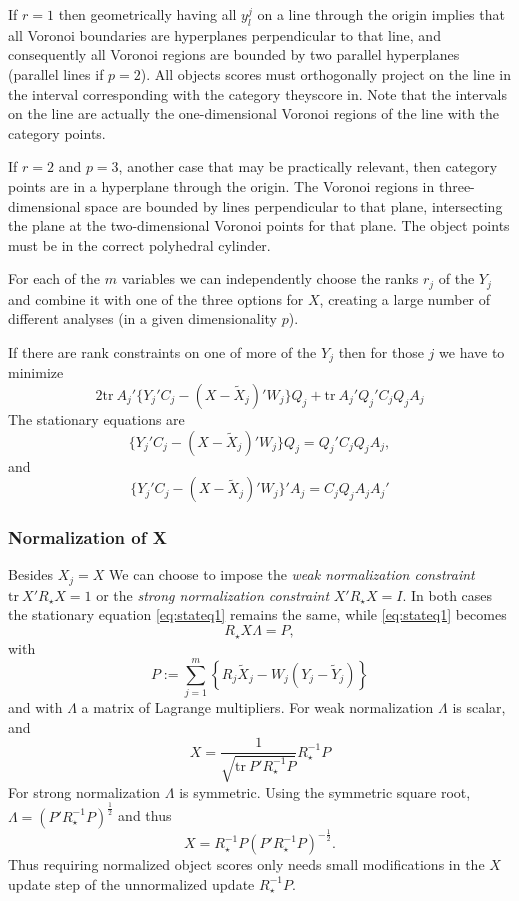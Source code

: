 \documentclass[
  12pt,
]{article}
\begin{document}
If \(r=1\) then geometrically having all \(y_l^j\) on a line through the origin implies that all Voronoi boundaries are hyperplanes perpendicular to that line, and consequently all Voronoi regions are bounded by two parallel hyperplanes (parallel lines if \(p=2\)). All objects scores must orthogonally project on the line in the interval corresponding with the category theyscore in. Note that the intervals on the line are actually the one-dimensional Voronoi regions of the line with the category points.

If \(r=2\) and \(p=3\), another case that may be practically relevant, then category points are in a hyperplane through the origin. The Voronoi regions in three-dimensional space are bounded by lines perpendicular to that plane, intersecting the plane at the two-dimensional Voronoi points for that plane. The object points must be in the correct polyhedral cylinder.

For each of the \(m\) variables we can independently choose the ranks \(r_j\) of the \(Y_j\) and combine it with one of the three options for \(X\), creating a large number of different analyses (in a given dimensionality \(p\)).

If there are rank constraints on one of more of the \(Y_j\) then for those \(j\) we have to minimize
\[
2\text{tr}\ A_j'\{Y_j'C_j-(X-\tilde X_j)'W_j\}Q_j+
\text{tr}\ A_j'Q_j'C_jQ_jA_j
\]
The stationary equations are
\[
\{Y_j'C_j-(X-\tilde X_j)'W_j\}Q_j=Q_j'C_jQ_jA_j,
\]
and
\[
\{Y_j'C_j-(X-\tilde X_j)'W_j\}'A_j=C_jQ_jA_jA_j'
\]

\subsubsection{Normalization of X}\label{normalization-of-x}

Besides \(X_j=X\) We can choose to impose the \emph{weak normalization constraint} \(\text{tr}\ X'R_\star X=1\) or the \emph{strong normalization constraint} \(X'R_\star X=I\). In both cases the stationary
equation \eqref{eq:stateq1} remains the same, while \eqref{eq:stateq1} becomes
\[
R_\star X\Lambda=P,
\]
with
\[
P:=\sum_{j=1}^m\left\{R_j\tilde X_j-W_j(Y_j-\tilde Y_j)\right\}
\]
and with \(\Lambda\) a matrix of Lagrange multipliers. For weak normalization \(\Lambda\)
is scalar, and
\[
X=\frac{1}{\sqrt{\text{tr}\ P'R_\star^{-1}P}}R_\star^{-1}P
\]
For strong normalization \(\Lambda\) is symmetric. Using the symmetric square root, \(\Lambda=(P'R_\star^{-1}P)^\frac12\) and thus
\[
X=R_\star^{-1}P(P'R_\star^{-1}P)^{-\frac12}.
\]
Thus requiring normalized object scores only needs small modifications in the \(X\) update step of the unnormalized update \(R_\star^{-1}P\).
\end{document}
